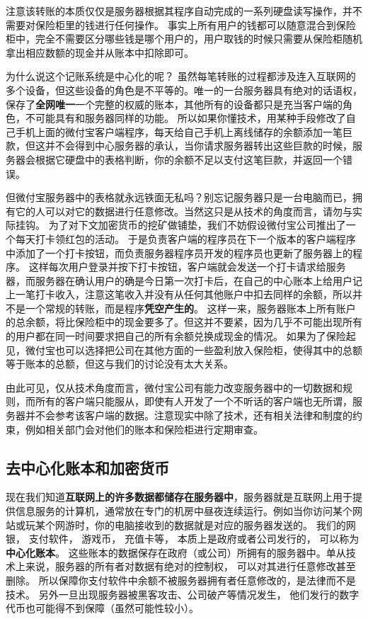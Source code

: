 注意该转账的本质仅仅是服务器根据其程序自动完成的一系列硬盘读写操作，并不需要对保险柜里的钱进行任何操作。 事实上所有用户的钱都可以随意混合到保险柜中，完全不需要区分哪些钱是哪个用户的，用户取钱的时候只需要从保险柜随机拿出相应数额的现金并从账本中扣除即可。

为什么说这个记账系统是中心化的呢？ 虽然每笔转账的过程都涉及连入互联网的多个设备，但这些设备的角色是不平等的。唯一的一台服务器具有绝对的话语权，保存了\textbf{全网唯一}一个完整的权威的账本，其他所有的设备都只是充当客户端的角色，不可能具有和服务器同样的功能。 所以如果你懂技术，用某种手段修改了自己手机上面的微付宝客户端程序，每天给自己手机上离线储存的余额添加一笔巨款，但这并不会得到中心服务器的承认，当你请求服务器转出这些巨款的时候，服务器会根据它硬盘中的表格判断，你的余额不足以支付这笔巨款，并返回一个错误。

但微付宝服务器中的表格就永远铁面无私吗？别忘记服务器只是一台电脑而已，拥有它的人可以对它的数据进行任意修改。当然这只是从技术的角度而言，请勿与实际挂钩。 为了对下文加密货币的挖矿做铺垫，我们不妨假设微付宝公司推出了一个每天打卡领红包的活动。 于是负责客户端的程序员在下一个版本的客户端程序中添加了一个打卡按钮，而负责服务器程序员开发的程序员也更新了服务器上的程序。 这样每次用户登录并按下打卡按钮，客户端就会发送一个打卡请求给服务器，而服务器在确认用户的确是今日第一次打卡后，在自己的中心账本上给用户记上一笔打卡收入，注意这笔收入并没有从任何其他账户中扣去同样的余额，所以并不是一个常规的转账，而是程序\textbf{凭空产生的}。 这样一来，服务器账本上所有账户的总余额，将比保险柜中的现金要多了。但这并不要紧，因为几乎不可能出现所有的用户都在同一时间要求把自己的所有余额兑换成现金的情况。 如果为了保险起见，微付宝也可以选择把公司在其他方面的一些盈利放入保险柜，使得其中的总额等于账本的总额，但这与我们的讨论没有太大关系。

由此可见，仅从技术角度而言，微付宝公司有能力改变服务器中的一切数据和规则，而所有的客户端只能服从，即使有人开发了一个不听话的客户端也无所谓，服务器并不会参考该客户端的数据。注意现实中除了技术，还有相关法律和制度的约束，例如相关部门会对他们的账本和保险柜进行定期审查。

\subsection{去中心化账本和加密货币}
现在我们知道\textbf{互联网上的许多数据都储存在服务器中}，服务器就是互联网上用于提供信息服务的计算机，通常放在专门的机房中昼夜连续运行。例如当你访问某个网站或玩某个网游时，你的电脑接收到的数据就是对应的服务器发送的。 我们的网银， 支付软件， 游戏币， 充值卡等， 本质上是政府或者公司发行的， 可以称为\textbf{中心化账本}。 这些账本的数据保存在政府（或公司）所拥有的服务器中。单从技术上来说，服务器的所有者对数据有绝对的控制权， 可以对其进行任意修改甚至删除。 所以保障你支付软件中余额不被服务器拥有者任意修改的，是法律而不是技术。 另外一旦出现服务器被黑客攻击、公司破产等情况发生， 他们发行的数字代币也可能得不到保障（虽然可能性较小）。

